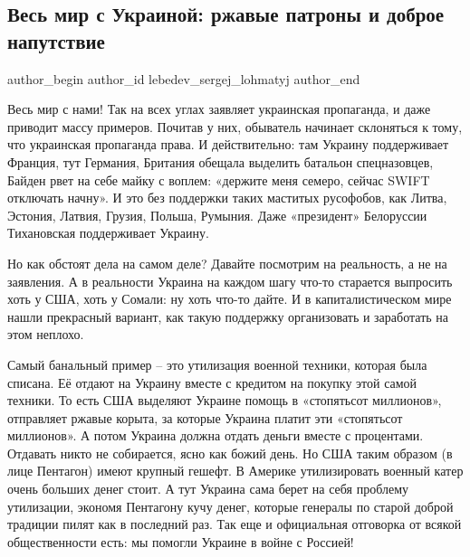  
 
 
 
 
\subsection{Весь мир с Украиной: ржавые патроны и доброе напутствие}
\label{sec:07_12_2021.stz.news.nvr.voshod_info.1.ves_mir_s_ukrainoj}

\ifcmt
 author_begin
   author_id lebedev_sergej_lohmatyj
 author_end
\fi

Весь мир с нами! Так на всех углах заявляет украинская пропаганда, и даже
приводит массу примеров. Почитав у них, обыватель начинает склоняться к тому,
что украинская пропаганда права. И действительно: там Украину поддерживает
Франция, тут Германия, Британия обещала выделить батальон спецназовцев, Байден
рвет на себе майку с воплем: «держите меня семеро, сейчас SWIFT отключать
начну». И это без поддержки таких маститых русофобов, как Литва, Эстония,
Латвия, Грузия, Польша, Румыния.  Даже «президент» Белоруссии Тихановская
поддерживает Украину.


Но как обстоят дела на самом деле? Давайте посмотрим на реальность, а не на
заявления. А в реальности Украина на каждом шагу что-то старается выпросить
хоть у США, хоть у Сомали: ну хоть что-то дайте. И в капиталистическом мире
нашли прекрасный вариант, как такую поддержку организовать и заработать на этом
неплохо.

Самый банальный пример – это утилизация военной техники, которая была списана.
Её отдают на Украину вместе с кредитом на покупку этой самой техники. То есть
США выделяют Украине помощь в «стопятьсот миллионов», отправляет ржавые корыта,
за которые Украина платит эти «стопятьсот миллионов». А потом Украина должна
отдать деньги вместе с процентами. Отдавать никто не собирается, ясно как божий
день. Но США таким образом (в лице Пентагон) имеют крупный гешефт. В Америке
утилизировать военный катер очень больших денег стоит. А тут Украина сама берет
на себя проблему утилизации, экономя Пентагону кучу денег, которые генералы по
старой доброй традиции пилят как в последний раз. Так еще и официальная
отговорка от всякой общественности есть: мы помогли Украине в войне с Россией!

